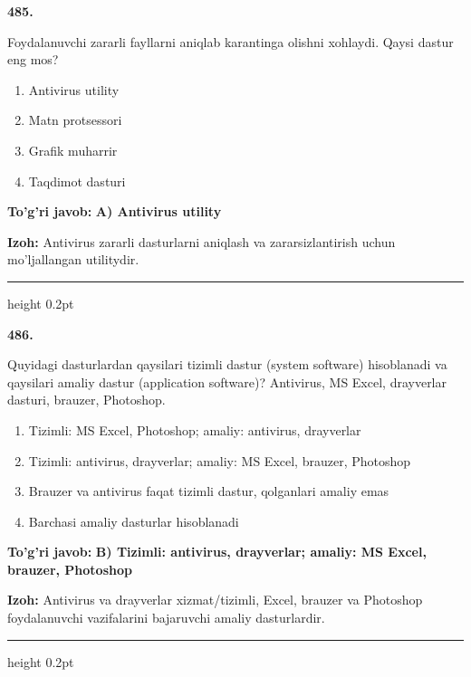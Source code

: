 \documentclass[10pt,a4paper]{article}
\begin{document}
{\bfseries\sffamily\color{ink} 485.}
\par
Foydalanuvchi zararli fayllarni aniqlab karantinga olishni xohlaydi. Qaysi dastur eng mos?
\begin{enumerate}[label=\Alph*),leftmargin=9mm]
\item Antivirus utility
\item Matn protsessori
\item Grafik muharrir
\item Taqdimot dasturi
\end{enumerate}
\begin{tcolorbox}[enhanced,breakable,colback=teal!4,colframe=teal!60!black,boxrule=0.45pt,arc=1.2mm,left=2.7mm,right=2.7mm,top=1.8mm,bottom=1.8mm,before skip=2mm,after skip=2mm]
{\bfseries\sffamily\color{teal}To'g'ri javob:} \textbf{A) Antivirus utility}
\par\smallskip
{\bfseries Izoh:} Antivirus zararli dasturlarni aniqlash va zararsizlantirish uchun mo'ljallangan utilitydir.
\end{tcolorbox}
\vspace{2mm}\hrule height 0.2pt\vspace{3mm}

{\bfseries\sffamily\color{ink} 486.}
\par
Quyidagi dasturlardan qaysilari tizimli dastur (system software) hisoblanadi va qaysilari amaliy dastur (application software)? Antivirus, MS Excel, drayverlar dasturi, brauzer, Photoshop.
\begin{enumerate}[label=\Alph*),leftmargin=9mm]
\item Tizimli: MS Excel, Photoshop; amaliy: antivirus, drayverlar
\item Tizimli: antivirus, drayverlar; amaliy: MS Excel, brauzer, Photoshop
\item Brauzer va antivirus faqat tizimli dastur, qolganlari amaliy emas
\item Barchasi amaliy dasturlar hisoblanadi
\end{enumerate}
\begin{tcolorbox}[enhanced,breakable,colback=teal!4,colframe=teal!60!black,boxrule=0.45pt,arc=1.2mm,left=2.7mm,right=2.7mm,top=1.8mm,bottom=1.8mm,before skip=2mm,after skip=2mm]
{\bfseries\sffamily\color{teal}To'g'ri javob:} \textbf{B) Tizimli: antivirus, drayverlar; amaliy: MS Excel, brauzer, Photoshop}
\par\smallskip
{\bfseries Izoh:} Antivirus va drayverlar xizmat/tizimli, Excel, brauzer va Photoshop foydalanuvchi vazifalarini bajaruvchi amaliy dasturlardir.
\end{tcolorbox}
\vspace{2mm}\hrule height 0.2pt\vspace{3mm}
\end{document}
